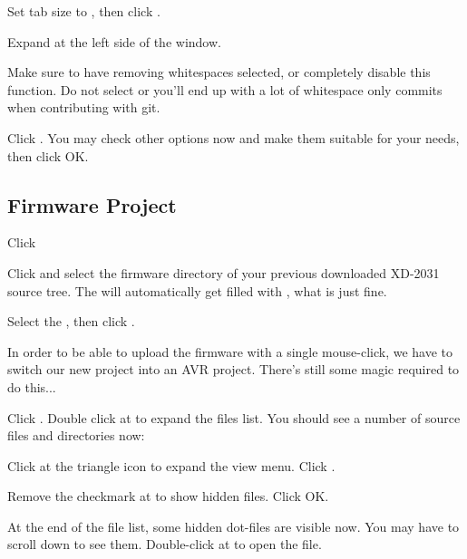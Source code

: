 Set tab size to , then click .


\clearpage
Expand  at the left side of the window.

Make sure to have removing whitespaces  selected, or completely disable
this function. Do not select  or you'll end up with a lot of whitespace only commits when contributing with git.

Click .  You may check other options now and make them suitable for your needs, then click OK.

\subsection{Firmware Project}
Click 

Click  and select the firmware directory of your previous downloaded \mbox{XD-2031} source
tree. The  will automatically get filled with , what is
just fine.

Select the , then click .


In order to be able to upload the firmware with a single mouse-click, we have to switch 
our new project into an AVR project. There's still some magic required to do this...

Click . Double click at  to expand the files list. You should see a number of source files and directories now:


Click at the triangle icon to expand the view menu. Click . 


\clearpage
Remove the checkmark at  to show hidden files. Click OK.

At the end of the file list, some hidden dot-files are visible now. You may have to scroll down to
see them. Double-click at  to open the file.

